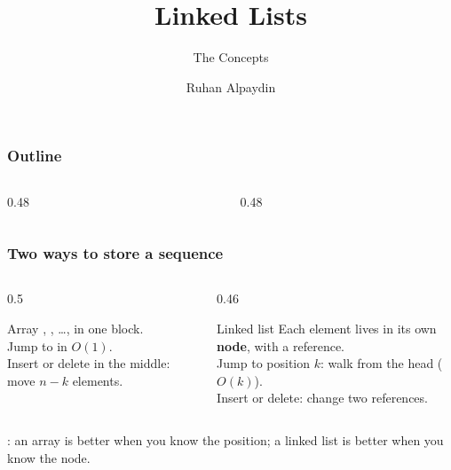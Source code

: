 \documentclass[aspectratio=169,10pt,compress]{beamer}
\title{Linked Lists}
\subtitle{The Concepts}
\author[Alpaydin]{Ruhan Alpaydin}
\institute[FCIS]{Faculty of Computer and Information Sciences\\Yeditepe University}
\date{{\tiny \hbTimeStamp}}
\begin{document}
\begin{frame}[t,fragile]
  \titlepage
\end{frame}




\begin{frame}[t,fragile] \frametitle{Outline}
  \begin{columns}[T]
    \begin{column}{0.48\textwidth}
      \tableofcontents[sections={1-3}, hideallsubsections]
    \end{column}
    \begin{column}{0.48\textwidth}
      \tableofcontents[sections={4-6}, hideallsubsections]
    \end{column}
  \end{columns}
\end{frame}





\begin{frame}[t,fragile] \frametitle{Two ways to store a sequence}
  \begin{columns}[T]
    \begin{column}{0.5\textwidth}
      \begin{block}{Array}
        \small
        , , \dots,  in one block.\\
        Jump to  in $O(1)$.\\
        Insert or delete in the middle: move $n-k$ elements.
      \end{block}
    \end{column}
    \begin{column}{0.46\textwidth}
      \begin{block}{Linked list}
        \small
        Each element lives in its own \textbf{node}, with a
         reference.\\
        Jump to position $k$: walk from the head ($O(k)$).\\
        Insert or delete: change two references.
      \end{block}
    \end{column}
  \end{columns}
  \vspace{0.4em}
  \small
  : an array is better when you know the
  position; a linked list is better when you know the node.
\end{frame}
\end{document}
